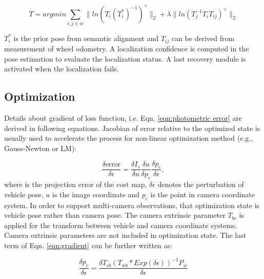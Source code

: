 \documentclass[letterpaper, 10 pt, conference]{ieeeconf}
\begin{document}
\begin{equation}
    T = argmin \sum_{i, j \in w} \| ln(T_{i}(T_{i}^{*})^{-1})^{\vee} \|_{2} + \lambda \| ln(T_{j}^{-1}T_{i}T_{ij})^{\vee} \|_{2}
\label{eqn:total cost}    
\end{equation}

$T_{i}^{*}$ is the prior pose from semantic alignment and $T_{ij}$ can be derived from measurement of wheel odometry. A localization confidence is computed in the pose estimation to evaluate the localization status. A lost recovery module is activated when the localization fails.

\subsection{Optimization}

Details about gradient of loss function, i.e. Eqn. \ref{eqn:photometric error} are derived in following equations. Jacobian of error relative to the optimized state is usually used to accelerate the process for non-linear optimization method (e.g., Gauss-Newton or LM):


\begin{equation}
\frac{\delta \text{error}}{\delta \epsilon} = \frac{\delta I_{s}}{\delta u} \frac{\delta u}{\delta p_c} \frac{\delta p_c}{\delta \epsilon},
\label{eqn:gradient}
\end{equation}
where  is the projection error of the cost map, ${\delta \epsilon}$ denotes the perturbation of vehicle pose, ${u}$ is the image coordinate and ${p_c}$ is the point in camera coordinate system. In order to support multi-camera observations, that optimization state is vehicle pose rather than camera pose.
The camera extrinsic parameter $T_{bc}$ is applied for the transform between vehicle and camera coordinate systems. Camera extrinsic parameters are not included in optimization state. The last term of Eqn. \ref{eqn:gradient} can be further written as:

\begin{equation}
\frac{\delta p_{c}}{ \delta\epsilon} = \frac {\delta T_{cb}(T_{wb} * Exp(\delta\epsilon))^{-1}P_{w}}{\delta \epsilon}
\label{eqn:cheap}
\end{equation}
\end{document}

